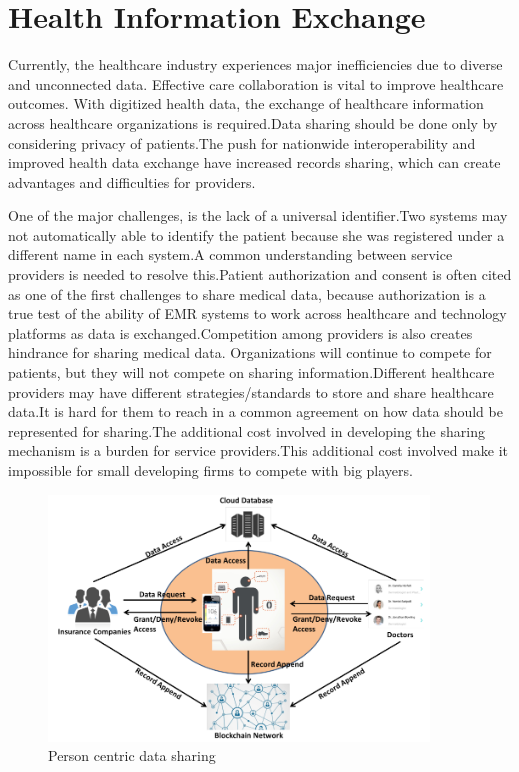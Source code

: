 \documentclass[12pt]{report}
\begin{document}
\section{Health Information Exchange}
Currently, the healthcare industry experiences major inefficiencies due to diverse and unconnected data. Effective care collaboration is vital to improve healthcare outcomes. With digitized health data, the exchange of healthcare information across healthcare organizations is required.Data sharing should be done only by considering privacy of patients.The push for nationwide interoperability and improved health data exchange have increased records sharing, which can create advantages and difficulties for providers.
\par One of the major challenges, is the lack of a universal identifier.Two systems may  not automatically able to identify the patient because she was registered under a different name in each system.A common understanding between service providers is needed to resolve this.Patient authorization and consent is often cited as one of the first challenges to share medical data, because authorization is a true test of the ability of EMR systems to work across healthcare and technology platforms as data is exchanged.Competition among providers is also creates hindrance for sharing medical data. Organizations will continue to compete for patients, but they will not compete on sharing information.Different healthcare providers may have different strategies/standards to store and share healthcare data.It is hard for them to reach in a common agreement on how data should be represented for sharing.The additional cost involved in developing the sharing mechanism is a burden for service providers.This additional cost involved make it impossible for small developing firms to compete with big players.

\begin{figure}[H]
\centering
\includegraphics[width=0.9\textwidth]{centric.png}
\caption{Person centric data sharing \cite{13}}
\label{centric}
\end{figure}
\end{document}
